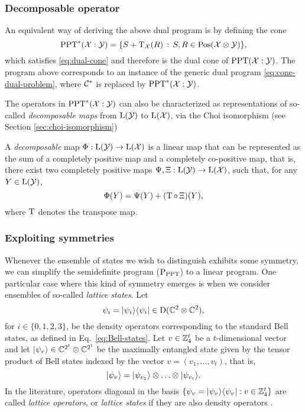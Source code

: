 \subsubsection{Decomposable operator}
An equivalent way of deriving the above dual program is by defining the cone 
\begin{equation}
  \mathrm{PPT}^{\ast}(\mathcal{X}:\mathcal{Y}) = \{ S + \operatorname{T}_{\mathcal{X}}(R) \,:\, S, R \in \mathrm{Pos}(\mathcal{X}\otimes\mathcal{Y}) \},
\end{equation}
which satisfies \eqref{eq:dual-cone} and therefore is the dual cone of 
$\mathrm{PPT}(\mathcal{X}:\mathcal{Y})$.
The program above corresponds to an instance of 
the generic dual program \eqref{eq:cone-dual-problem}, where $\mathcal{C}^{\ast}$ is 
replaced by $\mathrm{PPT}^{\ast}(\mathcal{X}:\mathcal{Y})$.

The operators in $\mathrm{PPT}^{\ast}(\mathcal{X}:\mathcal{Y})$ can also be characterized as 
representations of so-called \emph{decomposable maps} from 
$\mathrm{L}(\mathcal{Y})$ to $\mathrm{L}(\mathcal{X})$, via the Choi isomorphism 
(see Section \ref{sec:choi-isomorphism})
\begin{definition}
A \emph{decomposable} map $\Phi:\mathrm{L}(\mathcal{Y})\rightarrow\mathrm{L}(\mathcal{X})$ is a linear map that can 
be represented as the sum of a completely positive map and a completely 
co-positive map, that is, there exist two completely positive maps 
$\Psi,\Xi:\mathrm{L}(\mathcal{Y})\rightarrow\mathrm{L}(\mathcal{X})$, such that, for any $Y\in\mathrm{L}(\mathcal{Y})$,
\begin{equation}
  \Phi(Y) = \Psi(Y) + (\operatorname{T} {\circ}\, \Xi)(Y),
\end{equation}
where $\operatorname{T}$ denotes the transpose map.
\end{definition}



\subsubsection{Exploiting symmetries}

Whenever the ensemble of states we wish to distinguish exhibits some symmetry,
we can simplify the semidefinite program ($\textup{P}_{\mathrm{PPT}}$) to a linear program.
One particular case where this kind of symmetry emerges is when 
we consider ensembles of so-called \emph{lattice states}. Let
\[
  \psi_{i} = \lvert\mspace{0.5mu} \psi_{i} \mspace{0.5mu} \rangle\langle\mspace{0.5mu} \psi_{i} \mspace{0.5mu} \rvert \in \mathrm{D}(\mathbb{C}^{2}\otimes\mathbb{C}^{2}),
\]
for $i\in \{0,1,2,3\}$, be the density operators corresponding to the standard Bell 
states, as defined in Eq.~\eqref{eq:Bell-states}.
Let $v \in \mathbb{Z}_{4}^{t} $ be a $t$-dimensional vector and let 
$\lvert\mspace{0.5mu} \psi_{v} \mspace{0.5mu} \rangle \in \mathbb{C}^{2^{t}}\otimes\mathbb{C}^{2^{t}}$ 
be the maximally entangled state given by the tensor product of Bell states indexed by the vector 
$v = (v_{1}, \ldots, v_{t})$, that is,
$$
\lvert\mspace{0.5mu} \psi_{v} \mspace{0.5mu} \rangle = \lvert\mspace{0.5mu} \psi_{v_{1}} \mspace{0.5mu} \rangle\otimes\ldots\otimes\lvert\mspace{0.5mu} \psi_{v_{t}} \mspace{0.5mu} \rangle.
$$
In the literature, operators diagonal in the basis 
$\{\psi_{v} = \lvert\mspace{0.5mu} \psi_{v} \mspace{0.5mu} \rangle\langle\mspace{0.5mu} \psi_{v} \mspace{0.5mu} \rvert : v \in \mathbb{Z}_{4}^{t}\}$
are called \emph{lattice operators}, or \emph{lattice states} if they are also 
density operators \cite{Piani06}.

